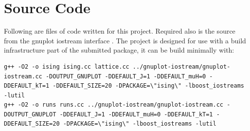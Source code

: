 \documentclass[12pt,a4paper,english]{article}
\begin{document}
\appendix

\section{Source Code}
\label{sec:source-code}

Following are files of code written for this project. Required also is the source from the gnuplot iostream interface \cite{gnuplot-iostream}.  The project is designed for use with a build infrastructure part of the submitted package, it can be build minimally with:
\begin{lstlisting}
g++ -O2 -o ising ising.cc lattice.cc ../gnuplot-iostream/gnuplot-iostream.cc -DOUTPUT_GNUPLOT -DDEFAULT_J=1 -DDEFAULT_muH=0 -DDEFAULT_kT=1 -DDEFAULT_SIZE=20 -DPACKAGE=\"ising\" -lboost_iostreams -lutil
g++ -O2 -o runs runs.cc ../gnuplot-iostream/gnuplot-iostream.cc -DOUTPUT_GNUPLOT -DDEFAULT_J=1 -DDEFAULT_muH=0 -DDEFAULT_kT=1 -DDEFAULT_SIZE=20 -DPACKAGE=\"ising\" -lboost_iostreams -lutil
\end{lstlisting}

\lstset{language=C++}




\end{document}
